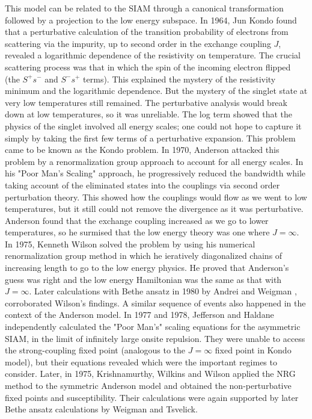 \documentclass[14pt]{extarticle}
\numberwithin{equation}{section}
\begin{document}
This model can be related to the SIAM through a canonical transformation followed by a projection to the low energy subspace.
In 1964, Jun Kondo\cite{Kondo} found that a perturbative calculation of the transition probability of electrons from scattering via the impurity, up to second order in the exchange coupling \(J\), revealed a logarithmic dependence of the resistivity on temperature.
The crucial scattering process was that in which the spin of the incoming electron flipped (the \(S^+ s^-\) and \(S^- s^+\) terms).
This explained the mystery of the resistivity minimum and the logarithmic dependence.
But the mystery of the singlet state at very low temperatures still remained.
The perturbative analysis would break down at low temperatures, so it was unreliable.
The log term showed that the physics of the singlet involved all energy scales; one could not hope to capture it simply by taking the first few terms of a perturbative expansion.
This problem came to be known as the Kondo problem.
\pb In 1970, Anderson attacked this problem by a renormalization group approach to account for all energy scales.
In his "Poor Man's Scaling" approach, he progressively reduced the bandwidth while taking account of the eliminated states into the couplings via second order perturbation theory.
This showed how the couplings would flow as we went to low temperatures, but it still could not remove the divergence as it was perturbative.
Anderson found that the exchange coupling increased as we go to lower temperatures, so he surmised that the low energy theory was one where \(J=\infty\).
In 1975, Kenneth Wilson solved the problem by using his numerical renormalization group method in which he ieratively diagonalized chains of increasing length to go to the low energy physics.
He proved that Anderson's guess was right and the low energy Hamiltonian was the same as that with \(J=\infty\).
Later calculations with Bethe ansatz in 1980 by Andrei and Weigman \cite{Andrei},\cite{Weigman} corroborated Wilson's findings.
\pb A similar sequence of events also happened in the context of the Anderson model. In 1977 and 1978, Jefferson and Haldane independently calculated the "Poor Man's" scaling equations for the asymmetric SIAM, in the limit of infinitely large onsite repulsion. They were unable to access the strong-coupling fixed point (analogous to the \(J=\infty\) fixed point in Kondo model), but their equations revealed which were the important regimes to consider. Later, in 1975, Krishnamurthy, Wilkins and Wilson applied the NRG method to the symmetric Anderson model and obtained the non-perturbative fixed points and susceptibility. Their calculations were again supported by later Bethe ansatz calculations by Weigman and Tsvelick\cite{Tsvelick}.
\end{document}
